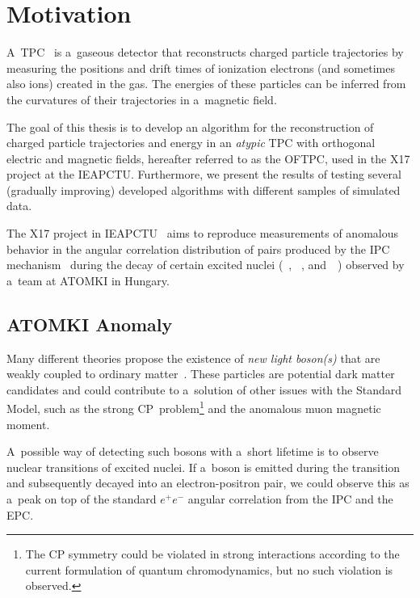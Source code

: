 \chapter{Motivation}
	A~\acf{TPC}~\cite{nygren} is a~gaseous detector that reconstructs charged particle trajectories by measuring the positions and drift times of ionization electrons (and sometimes also ions) created in the gas. The energies of these particles can be inferred from the curvatures of their trajectories in a~magnetic field.
	
	The goal of this thesis is to develop an algorithm for the reconstruction of charged particle trajectories and energy in an \emph{atypic} \ac{TPC} with orthogonal electric and magnetic fields, hereafter referred to as the \ac{OFTPC}, used in the X17 project at the \ac{IEAPCTU}. Furthermore, we present the results of testing several (gradually improving) developed algorithms with different samples of simulated data.
	
	The X17 project in \ac{IEAPCTU}~\cite{x17_utef} aims to reproduce measurements of anomalous behavior in the angular correlation distribution of pairs produced by the \ac{IPC} mechanism~\cite{IPC} during the decay of certain excited nuclei (~\cite{atomki_be,atomki_be2}, ~\cite{atomki_c}, and~~\cite{atomki_he,atomki_he2}) observed by a~team at ATOMKI in Hungary.
	
	\section{ATOMKI Anomaly}
	\label{sec:ATOMKI}
		Many different theories propose the existence of \emph{new light boson(s)} that are weakly coupled to ordinary matter~\cite{dark}. These particles are potential dark matter candidates and could contribute to a~solution of other issues with the Standard Model, such as the strong CP~problem\footnote{The CP symmetry could be violated in strong interactions according to the current formulation of quantum chromodynamics, but no such violation is observed.} and the anomalous muon magnetic moment.
		
		A~possible way of detecting such bosons with a~short lifetime is to observe nuclear transitions of excited nuclei. If a~boson is emitted during the transition and subsequently decayed into an electron\nobreakdash-positron pair, we could observe this as a~peak on top of the standard $e^+e^-$ angular correlation from the \acf{IPC} and the \acf{EPC}.
	
